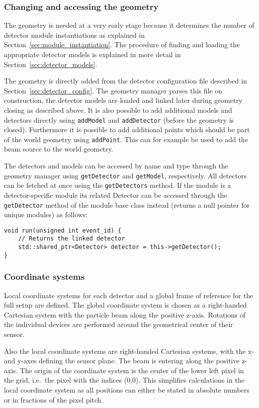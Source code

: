 \subsubsection{Changing and accessing the geometry}
The geometry is needed at a very early stage because it determines the number of detector module instantiations as explained in Section~\ref{sec:module_instantiation}.
The procedure of finding and loading the appropriate detector models is explained in more detail in Section~\ref{sec:detector_models}.

The geometry is directly added from the detector configuration file described in Section~\ref{sec:detector_config}.
The geometry manager parses this file on construction, the detector models are loaded and linked later during geometry closing as described above.
It is also possible to add additional models and detectors directly using \texttt{addModel} and \texttt{addDetector} (before the geometry is closed).
Furthermore it is possible to add additional points which should be part of the world geometry using \texttt{addPoint}.
This can for example be used to add the beam source to the world geometry.

The detectors and models can be accessed by name and type through the geometry manager using \texttt{getDetector} and \texttt{getModel}, respectively.
All detectors can be fetched at once using the \texttt{getDetectors} method.
If the module is a detector-specific module its related Detector can be accessed through the \texttt{getDetector} method of the module base class instead (returns a null pointer for unique modules) as follows:
\begin{verbatim}
void run(unsigned int event_id) {
    // Returns the linked detector
    std::shared_ptr<Detector> detector = this->getDetector();
}
\end{verbatim}

\subsubsection{Coordinate systems}

Local coordinate systems for each detector and a global frame of reference for the full setup are defined.
The global coordinate system is chosen as a right-handed Cartesian system with the particle beam along the positive z-axis.
Rotations of the individual devices are performed around the geometrical center of their sensor.

Also the local coordinate systems are right-handed Cartesian systems, with the x- and y-axes defining the sensor plane.
The beam is entering along the positive z-axis.
The origin of the coordinate system is the center of the lower left pixel in the grid, i.e.\ the pixel with the indices (0,0).
This simplifies calculations in the local coordinate system as all positions can either be stated in absolute numbers or in fractions of the pixel pitch.


